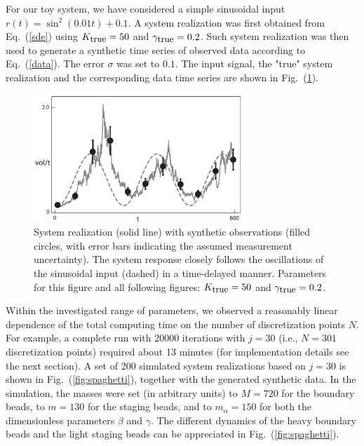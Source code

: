 \documentclass[11pt]{article}
\theoremstyle{definition}
\begin{document}
For our toy system, we have considered a simple sinusoidal input  $r(t) = \sin^2 \left( 0.01 t \right) + 0.1$. A system realization was first obtained from Eq.~(\ref{sde}) using $K_{\mbox{\small true}} = 50$ and $\gamma_{\mbox{\small true}}=0.2$.
Such system realization was then used to generate a synthetic time series of observed data according to Eq.~(\ref{data}). The error $\sigma$ was set to $0.1$. The input signal, the "true" system realization and the corresponding data time series are shown in Fig.~(\ref{fig:rain_data_S}).
\begin{figure}[htb!]
    \centering
    \includegraphics[width=0.7\textwidth]{Fig2.pdf}
    \caption{\label{fig:rain_data_S}
    System realization (solid line) with synthetic observations (filled circles, with error bars indicating the assumed measurement uncertainty).
    The system response closely follows the oscillations of the sinusoidal input (dashed) in a time-delayed manner.
    Parameters for this figure and all following figures: $K_{\mbox{\small true}} = 50$ and $\gamma_{\mbox{\small true}} = 0.2$.
}
\end{figure}
Within the investigated range of parameters, we observed a reasonably linear dependence of the total computing time on the number of discretization points $N$. For example, a complete run with 20000 iterations with $j=30$ (i.e., $N = 301$ discretization points) required about 13 minutes (for implementation details see the next section). A set of 200 simulated system realizations based on $j=30$ is shown in Fig.~(\ref{fig:spaghetti}), together with the generated synthetic data. In the simulation, the masses were set (in arbitrary units) to $M=720$ for the boundary beads, to $m=130$ for the staging beads, and to $m_\alpha=150$ for both the dimensionless parameters $\beta$ and $\gamma$. The different dynamics of the heavy boundary beads and the light staging beads can be appreciated in Fig.~(\ref{fig:spaghetti}).
\end{document}
